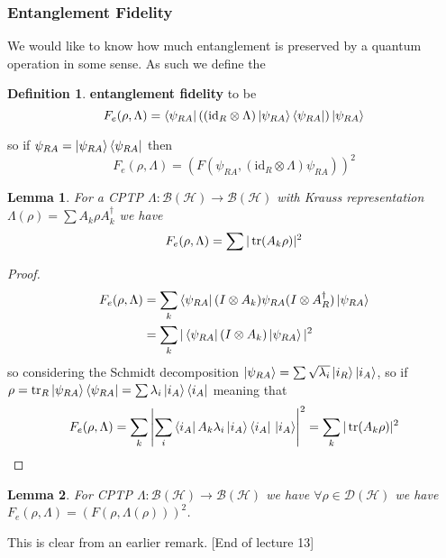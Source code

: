 \documentclass{article}
\newtheorem{lemma}{Lemma}
\theoremstyle{definition}
\newtheorem{definition}{Definition}
\newcommand{\id}{\text{id}}
\begin{document}
\subsubsection{Entanglement Fidelity}

We would like to know how much entanglement is preserved by a quantum operation
in some sense. As such we define the
\begin{definition}
  \textbf{entanglement fidelity} to be
  \begin{equation}
    F_e(\rho, \Lambda) = \bra{\psi_{RA}} \left( (\id_R \otimes \Lambda) 
    \ket{\psi_{RA}} \bra{\psi_{RA}} \right) \ket{\psi_{RA}}
  \end{equation}
\end{definition}
so if $\psi_{RA} = \ket{\psi_{RA}} \bra{\psi_{RA}}$ then 
\begin{equation}
  F_e(\rho, \Lambda) = (F(\psi_{RA}, (\id_R \otimes \Lambda) \psi_{RA}))^2
\end{equation}
\begin{lemma}
  For a CPTP $\Lambda : \mathcal{B(H) \to B(H)}$ with Krauss representation
  $\Lambda(\rho) = \sum A_k \rho A_k^\dagger$ we have
  \begin{equation}
    F_e(\rho, \Lambda) = \sum |\tr(A_k \rho)|^2
  \end{equation}
\end{lemma}
\begin{proof}
  \begin{align*}
    F_e(\rho, \Lambda)
    &= \sum_k \bra{\psi_{RA}} (I \otimes A_k) \psi_{RA} (I \otimes A_R^\dagger)
    \ket{\psi_{RA}} \\
    &= \sum_k |\bra{\psi_{RA}} (I \otimes A_k) \ket{\psi_{RA}}|^2
  \end{align*}
  so considering the Schmidt decomposition $\ket{\psi_{RA}} = \sum 
  \sqrt{\lambda_i} \ket{i_R} \ket{i_A}$, so if $\rho = \tr_R \ket{\psi_{RA}}
  \bra{\psi_{RA}} = \sum \lambda_i \ket{i_A} \bra{i_A}$ meaning that
  \begin{equation*}
    F_e(\rho, \Lambda) = \sum_k \left| \sum_i \bra{i_A} A_k \lambda_i \ket{i_A}
    \bra{i_A} \, \ket{i_A} \right|^2 = \sum_k | \tr (A_k \rho) |^2
  \end{equation*}
\end{proof}
\begin{lemma}
  For CPTP $\Lambda : \mathcal{B(H) \to B(H)}$ we have $\forall \rho \in 
  \mathcal{D(H)}$ we have $F_e(\rho, \Lambda) = (F(\rho, \Lambda(\rho)))^2$.
\end{lemma}
This is clear from an earlier remark. [End of lecture 13]
\end{document}
